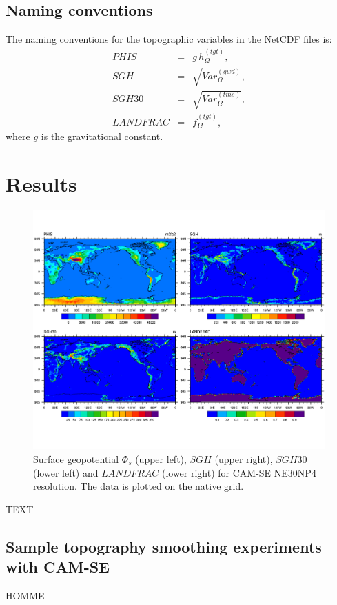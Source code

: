 \documentclass[gmd]{copernicus}
\begin{document}
\subsection{Naming conventions}\label{sec:naming-conventions}
The naming conventions for the topographic variables in the NetCDF files is:
\begin{eqnarray}
PHIS  &=& g\, {\overline{h}}^{(tgt)}_{\Omega},\\
SGH   &=& \sqrt{Var^{(gwd)}_\Omega},\\
SGH30 &=& \sqrt{Var^{(tms)}_\Omega},\\
LANDFRAC &=& \overline{f}^{(tgt)}_\Omega,
\end{eqnarray}
where $g$ is the gravitational constant.
{\color{red}{is SGH computed on $\Phi_s$ or $h$?}}


\section{Results}
\begin{figure}[t]
\vspace*{2mm}
\begin{center}
\includegraphics[width=12cm]{fig/topo-vars_global}
\end{center}
  \caption{Surface geopotential $\Phi_s$ (upper left), $SGH$ (upper right), $SGH30$ (lower left) and $LANDFRAC$ (lower right) for CAM-SE NE30NP4 resolution. The data is plotted on the native grid.}\label{fig:topo-vars}
\end{figure}


TEXT

\subsection{Sample topography smoothing experiments with CAM-SE}
HOMME \citep[High-Order Method Modeling Environment; ][]{HOMME,DetAl2005IJHPCA}\\
\end{document}
